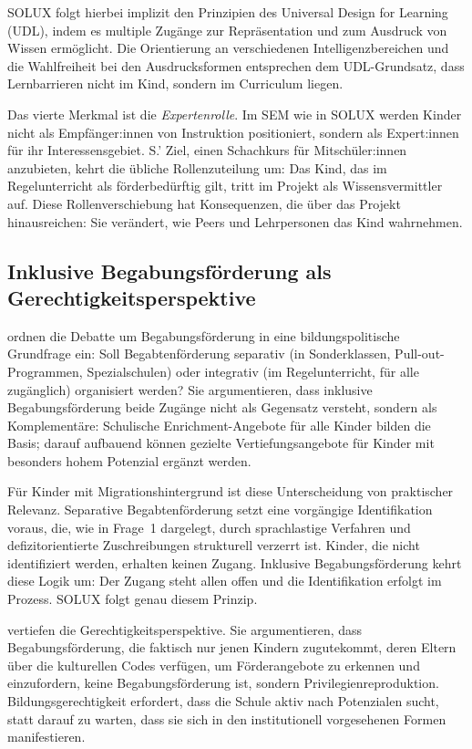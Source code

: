 \documentclass[ngerman, a4paper]{article}
\begin{document}
SOLUX folgt hierbei implizit den Prinzipien des Universal Design for Learning
(UDL), indem es multiple Zugänge zur Repräsentation und zum Ausdruck von Wissen
ermöglicht. Die Orientierung an verschiedenen Intelligenzbereichen und die
Wahlfreiheit bei den Ausdrucksformen entsprechen dem UDL-Grundsatz, dass
Lernbarrieren nicht im Kind, sondern im Curriculum liegen.

Das vierte Merkmal ist die \textit{Expertenrolle}. Im SEM wie in SOLUX werden Kinder
nicht als Empfänger:innen von Instruktion positioniert, sondern als Expert:innen
für ihr Interessensgebiet. S.' Ziel, einen Schachkurs für Mitschüler:innen
anzubieten, kehrt die übliche Rollenzuteilung um: Das Kind, das im Regelunterricht
als förderbedürftig gilt, tritt im Projekt als Wissensvermittler auf. Diese
Rollenverschiebung hat Konsequenzen, die über das Projekt hinausreichen: Sie
verändert, wie Peers und Lehrpersonen das Kind wahrnehmen.

\subsection{Inklusive Begabungsförderung als Gerechtigkeitsperspektive}

\textcite{weigand2021separativ} ordnen die Debatte um Begabungsförderung in eine bildungspolitische
Grundfrage ein: Soll Begabtenförderung separativ (in Sonderklassen, Pull-out-Programmen,
Spezialschulen) oder integrativ (im Regelunterricht, für alle zugänglich) organisiert
werden? Sie argumentieren, dass inklusive Begabungsförderung beide Zugänge nicht als
Gegensatz versteht, sondern als Komplementäre: Schulische Enrichment-Angebote für alle
Kinder bilden die Basis; darauf aufbauend können gezielte Vertiefungsangebote für
Kinder mit besonders hohem Potenzial ergänzt werden.

Für Kinder mit Migrationshintergrund ist diese Unterscheidung von praktischer
Relevanz. Separative Begabtenförderung setzt eine vorgängige Identifikation voraus,
die, wie in Frage~1 dargelegt, durch sprachlastige Verfahren und defizitorientierte
Zuschreibungen strukturell verzerrt ist. Kinder, die nicht identifiziert werden,
erhalten keinen Zugang. Inklusive Begabungsförderung kehrt diese Logik um: Der
Zugang steht allen offen und die Identifikation erfolgt im Prozess. SOLUX folgt
genau diesem Prinzip.

\textcite{sedmak2021bildungsgerechtigkeit} vertiefen die Gerechtigkeitsperspektive. Sie argumentieren, dass
Begabungsförderung, die faktisch nur jenen Kindern zugutekommt, deren Eltern über
die kulturellen Codes verfügen, um Förderangebote zu erkennen und einzufordern, keine
Begabungsförderung ist, sondern Privilegienreproduktion. Bildungsgerechtigkeit
erfordert, dass die Schule aktiv nach Potenzialen sucht, statt darauf zu warten,
dass sie sich in den institutionell vorgesehenen Formen manifestieren.
\end{document}
